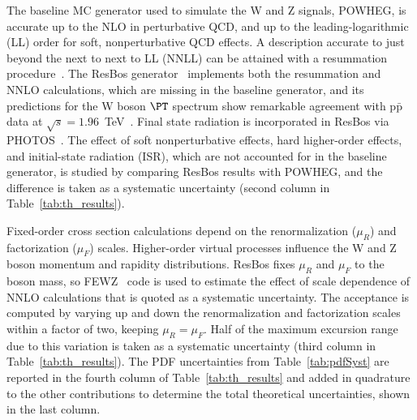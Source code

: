 The baseline MC generator used to simulate the W and Z signals, {\sc POWHEG}, is
accurate up to the NLO in perturbative QCD, and up to
the leading-logarithmic (LL) order  for soft, nonperturbative QCD effects.
A description accurate to just beyond the next to next to LL (NNLL)
can be attained with a resummation procedure~\cite{Collins-1, Collins-2}.
The {\sc ResBos} generator~\cite{ResBos} implements both the resummation and NNLO calculations,
which are missing in the baseline generator, and its predictions for the W boson $\PT$ spectrum 
show remarkable agreement with $\mathrm{p}\bar{\mathrm{p}}$ data at 
$\sqrt{s} = 1.96$~TeV~\cite{ResBosComp}. Final state radiation is incorporated 
in {\sc ResBos} via {\sc PHOTOS}~\cite{PHOTOS}.
The effect of soft nonperturbative effects, hard higher-order effects, and initial-state radiation (ISR),
which are not accounted for in the baseline generator, is studied by comparing {\sc ResBos} 
results with {\sc POWHEG},
and the difference is taken as a systematic uncertainty (second column in Table~\ref{tab:th_results}).

Fixed-order cross section calculations depend on the renormalization ($\mu_R$) and factorization
 ($\mu_F$) scales. 
Higher-order virtual 
processes influence the W and Z boson momentum and rapidity distributions. 
{\sc ResBos} fixes $\mu_R$ and $\mu_F$ to the boson mass, so 
{\sc FEWZ}~\cite{Melnikov:2006kv, Melnikov:2006di} code is used to
estimate the effect of scale dependence of NNLO calculations that is quoted as a systematic uncertainty.
The acceptance is computed by varying up and down the renormalization 
and factorization scales within a factor of two, keeping $\mu_R =\mu_F$.
Half of the maximum excursion range due to this variation is taken as a systematic
uncertainty (third column in Table~\ref{tab:th_results}). The PDF uncertainties
from Table~\ref{tab:pdfSyst} are reported in the fourth column of Table~\ref{tab:th_results}
and added in quadrature to the other contributions to determine the total theoretical
uncertainties, shown in the last column.

